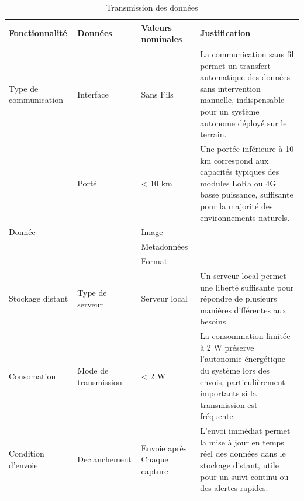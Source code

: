 \begin{table}[ht]
   \renewcommand{\arraystretch}{1.5} %
   \vspace*{-5.5cm}
   \begin{tabularx}{\textwidth}{|p{3cm}|p{2.7cm}|p{2.5cm}|X|}
      \hline
      \textbf{Fonctionnalité} & \textbf{Données}     & \textbf{Valeurs nominales}  & \textbf{Justification}                                                                                                                                           \\
      \hline
      Type de communication   & Interface            & Sans Fils                   & La communication sans fil permet un transfert automatique des données sans intervention manuelle, indispensable pour un système autonome déployé sur le terrain. \\
      \hline
                              & Porté                & < 10 km                     & Une portée inférieure à 10 km correspond aux capacités typiques des modules LoRa ou 4G basse puissance, suffisante pour la majorité des environnements naturels. \\
      \hline
      Donnée                  &                      & Image                       &                                                                                                                                                                  \\
      \hline
                              &                      & Metadonnées                 &                                                                                                                                                                  \\
      \hline
                              &                      & Format                      &                                                                                                                                                                  \\
      \hline
      Stockage distant        & Type de serveur      & Serveur local               & Un serveur local permet une liberté suffisante pour répondre de plusieurs manières différentes aux besoins                                                       \\
      \hline
      Consomation             & Mode de transmission & < 2 W                       & La consommation limitée à 2 W préserve l'autonomie énergétique du système lors des envois, particulièrement importants si la transmission est fréquente.         \\
      \hline
      Condition d'envoie      & Declanchement        & Envoie après Chaque capture & L'envoi immédiat permet la mise à jour en temps réel des données dans le stockage distant, utile pour un suivi continu ou des alertes rapides.                   \\
      \hline
   \end{tabularx}
   \caption{Transmission des données}
\end{table}